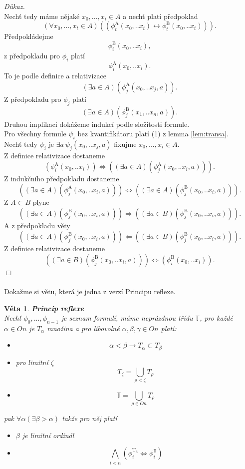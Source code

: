 \documentclass[12pt,a4paper]{article}
\newtheorem{veta}{V\v{e}ta}[section]%
\newenvironment{proof}
{\noindent \textit{D\r{u}kaz.}}
{\hspace*{\fill} $\Box$}
\begin{document}
\begin{proof}
~\\
Nech\v{t} tedy m\'{a}me n\v{e}jak\'{e} $ x_0,...,x_i \in A  $ a nech\v{t} plat\'{i} p\v{r}edpoklad
\[ (\forall x_0,...,x_t \in A) ((\phi_{t}^\mathrm{A}(x_0,..x_t) \leftrightarrow  \phi_{t}^\mathrm{B}(x_0,..x_t) )) . \] 
P\v{r}edpokl\'{a}dejme
\[ \phi_{i}^\mathrm{B}(x_0,..x_i) , \]
z p\v{r}edpokladu pro  $ \phi_{i} $ plat\'{i}
\[ \phi_{i}^\mathrm{A}(x_0,..x_i) . \]
To je podle definice a relativizace
\[ (\exists a \in A) (\phi_{j}^\mathrm{A}(x_0,..x_j,a)) . \]
Z p\v{r}edpokladu pro  $ \phi_{j} $ plat\'{i}
\[ (\exists a \in A) (\phi_{j}^\mathrm{B}(x_1,..x_n,a)) . \]
Druhou implikaci dok\'{a}\v{z}eme indukc\'{i} podle slo\v{z}itosti formule. \\
Pro v\v{s}echny formule $  \psi_{i} $ bez kvantifik\'{a}toru plat\'{i} (1) z lemma \ref{lem:transa}.\\
Nech\v{t} tedy  $  \psi_{i} $ je $ \exists a ~ \psi_{j}(x_0,..x_j,a) $ fixujme $ x_0,...,x_i \in A  $. \\
Z definice relativizace dostaneme
\[  (\phi_{i}^\mathrm{A}(x_0,..x_i))  \Leftrightarrow ((\exists a \in A) (\phi_{j}^\mathrm{A}(x_0,..x_i,a))) .\]
Z induk\v{c}n\'{i}ho p\v{r}edpokladu dostaneme
\[ ((\exists a \in A) (\phi_{j}^\mathrm{A}(x_0,..x_i,a))) \Leftrightarrow ((\exists a \in A) (\phi_{j}^\mathrm{B}(x_0,..x_i,a))) .\]
Z $  A \subset B $ plyne 
\[ ((\exists a \in A) (\phi_{j}^\mathrm{B}(x_0,..x_i,a))) \Rightarrow ((\exists a \in B) (\phi_{j}^\mathrm{B}(x_0,..x_i,a))).\]
A z p\v{r}edpokladu v\v{e}ty \[ ((\exists a \in A) (\phi_{j}^\mathrm{B}(x_0,..x_i,a))) \Leftarrow ((\exists a \in B) (\phi_{j}^\mathrm{B}(x_0,..x_i,a))).\]
Z definice relativizace dostaneme
\[  ((\exists a \in B) (\phi_{j}^\mathrm{B}(x_0,..x_i,a))) \Leftrightarrow   (\phi_{i}^\mathrm{B}(x_0,..x_i)) .\]
\end{proof}~\\~\\
Doka\v{z}me si v\v{e}tu, kter\'{a} je jedna z verz\'{i} Principu reflexe.
\begin{veta}
\textbf{Princip reflexe\\}
Nech\v{t} $ \phi_0,...,\phi_{n-1}  $ je seznam formul\'{i},  m\'{a}me nepr\'{a}zdnou t\v{r}\'{i}du $ \mathbb{T} $, pro ka\v{z}d\'{e} $  \alpha  \in \textit{On}$ je $ T_\alpha $ mno\v{z}ina a pro libovoln\'{e}   $  \alpha,\beta,\gamma  \in \textit{On}$ plat\'{i}:
\begin{itemize}
\item \[ \alpha < \beta \rightarrow T_\alpha \subset T_\beta \]
\item pro limitn\'{i} $ \zeta $
\[ T_\zeta=\bigcup_{\rho < \zeta} T_\rho \]
\item
\[ \mathbb{T}= \bigcup_{\rho \in  \textit{On}} T_\rho \] 
\end{itemize}
pak $  \forall \alpha (\exists \beta > \alpha) $ tak\v{z}e pro n\v{e}j plat\'{i} \begin{itemize}
  \item $ \beta $  je limitn\'{i} ordin\'{a}l
  \item \[ \bigwedge_{i<n}(\phi_{i}^\mathrm{T_\beta} \Leftrightarrow \phi_{i}^\mathbb{T})  \]
  \end{itemize}
\label{vet:refle}
\end{veta}
\end{document}

